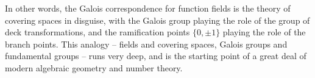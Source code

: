 \documentclass[a4paper]{scrartcl}
\begin{document}
In other words, the Galois correspondence for function fields is the theory of covering spaces in disguise, with the Galois group playing the role of the group of deck transformations, and the ramification points $\{0,\pm1\}$ playing the role of the branch points. This analogy -- fields and covering spaces, Galois groups and fundamental groups -- runs very deep, and is the starting point of a great deal of modern algebraic geometry and number theory.
\end{document}

